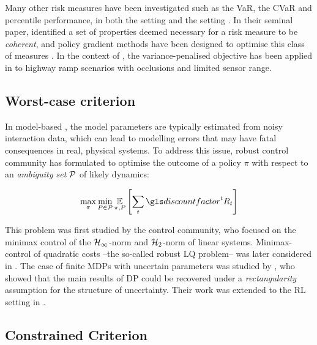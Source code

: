 Many other risk measures have been investigated such as the \gls{VaR}, the \gls{CVaR} and percentile performance, in both the  setting \citet{Torossian19a} and the  setting \citep{Moody2001,Tamar2012,Prashanth2013,Delage2010}. In their seminal paper, \citet{Artzner1999} identified a set of properties deemed necessary for a risk measure to be \emph{coherent}, and policy gradient methods have been designed to optimise this class of measures \citep{Tamar2015}.
In the context of , the variance-penalised objective has been applied in \eg \citep{Naghshvar2018} to highway ramp scenarios with occlusions and limited sensor range.

\subsection{Worst-case criterion}

In \gls{model-based} , the model parameters are typically estimated from noisy interaction data, which can lead to modelling errors that may have fatal consequences in real, physical systems. To address this issue, robust control community has formulated to optimise the outcome of a policy $\pi$ with respect to an \emph{ambiguity set} $\mathcal{P}$ of likely dynamics:

\begin{equation*}
\max_\pi \min_{P\in\cP} \expectedvalue_{\pi, P} \left[\sum_t \discount^t R_t\right]
\end{equation*}

This problem was first studied by the control community, who focused on the minimax control of the $\mathcal{H}_\infty$-norm \citep[][]{Basar1996} and $\mathcal{H}_2$-norm \citep{Berkenkamp2015} of linear systems. Minimax-control of quadratic costs --the so-called robust \gls{LQ} problem-- was later considered in \citep{abbasi-yadkori11a,Ibrahimi2013,Faradonbeh2020,Ouyang2017,abeille18a,Dean2019,Dean2018}.
The case of finite \glspl{MDP} with uncertain parameters was studied by \citet{Iyengar2005,Nilim2005,Wiesemann2013}, who showed that the main results of \gls{DP} could be recovered under a \emph{rectangularity} assumption for the structure of uncertainty. Their work was extended to the \gls{RL} setting in \citep{Tamar2014}.


\subsection{Constrained Criterion}
\label{sec:constrained-criterion}

